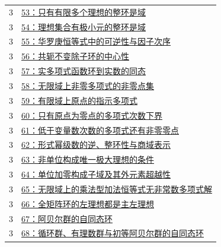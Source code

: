 \documentclass[UTF8,a4paper,11pt,fontset=windows]{ctexart}
\begin{document}
\begin{longtable}{cp{13.5cm}}
3 & \hyperref[ex:3:53]{53：只有有限多个理想的整环是域}\\
3 & \hyperref[ex:3:54]{54：理想集合有极小元的整环是域}\\
3 & \hyperref[ex:3:55]{55：华罗庚恒等式中的可逆性与因子次序}\\
3 & \hyperref[ex:3:56]{56：共轭不变除子环的中心性}\\
3 & \hyperref[ex:3:57]{57：实多项式函数环到实数的同态}\\
3 & \hyperref[ex:3:58]{58：无限域上非零多项式的非零点集}\\
3 & \hyperref[ex:3:59]{59：有限域上原点的指示多项式}\\
3 & \hyperref[ex:3:60]{60：只有原点为零点的多项式次数下界}\\
3 & \hyperref[ex:3:61]{61：低于变量数次数的多项式还有非零零点}\\
3 & \hyperref[ex:3:62]{62：形式幂级数的逆、整环性与商域表示}\\
3 & \hyperref[ex:3:63]{63：非单位构成唯一极大理想的条件}\\
3 & \hyperref[ex:3:64]{64：单位加零构成子域及其外元素超越性}\\
3 & \hyperref[ex:3:65]{65：无限域上的乘法型加法恒等式无非常数多项式解}\\
3 & \hyperref[ex:3:66]{66：全矩阵环的左理想都是主左理想}\\
3 & \hyperref[ex:3:67]{67：阿贝尔群的自同态环}\\
3 & \hyperref[ex:3:68]{68：循环群、有理数群与初等阿贝尔群的自同态环}\\
\bottomrule\end{longtable}
\end{document}
